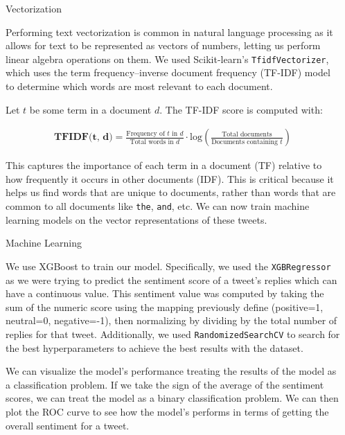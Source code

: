 \documentclass[final]{beamer}
\def\code#1{\texttt{#1}}
\newlength{\sepwidth}
\newlength{\colwidth}
\newcommand{\separatorcolumn}{\begin{column}{\sepwidth}\end{column}}
\begin{document}
\begin{frame}[t]
\begin{columns}[t]
\separatorcolumn

\begin{column}{\colwidth}

  \begin{block}{Vectorization}

    Performing text vectorization is common in natural language processing as it allows for text to be represented as vectors of numbers, letting us perform linear algebra operations on them. We used Scikit-learn's \code{TfidfVectorizer}, which uses the term frequency–inverse document frequency (TF-IDF) model to determine which words are most relevant to each document.
    
    Let $t$ be some term in a document $d$. The TF-IDF score is computed with:

    \begin{align*}
      \textbf{TFIDF(t, d)} = \frac{\text{Frequency of } t \text{ in } d}{\text{Total words in } d}
                       \cdot \text{log}\left(\frac{\text{Total documents}}{\text{Documents containing } t}\right)
    \end{align*}

    This captures the importance of each term in a document (TF) relative to how frequently it occurs in other documents (IDF). This is critical because it helps us find words that are unique to documents, rather than words that are common to all documents like \code{the}, \code{and}, etc. We can now train machine learning models on the vector representations of these tweets.

  \end{block}

  \begin{block}{Machine Learning}

    We use XGBoost to train our model. Specifically, we used the \code{XGBRegressor} as we were trying to predict the sentiment score of a tweet's replies which can have a continuous value. This sentiment value was computed by taking the sum of the numeric score using the mapping previously define (positive=1, neutral=0, negative=-1), then normalizing by dividing by the total number of replies for that tweet. Additionally, we used \code{RandomizedSearchCV} to search for the best hyperparameters to achieve the best results with the dataset.

    We can visualize the model's performance treating the results of the model as a classification problem. If we take the sign of the average of the sentiment scores, we can treat the model as a binary classification problem. We can then plot the ROC curve to see how the model's performs in terms of getting the overall sentiment for a tweet. 


\end{block}
\end{column}
\end{columns}
\end{frame}
\end{document}
